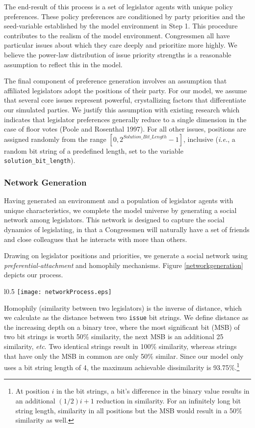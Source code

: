 \documentclass[pdftex,12pt]{llncs}
\begin{document}
The end-result of this process is a set of legislator agents with unique policy preferences. 
These policy preferences are conditioned by party priorities and the seed-variable established by the model environment in Step 1. 
This procedure contributes to the realism of the model environment. 
Congressmen all have particular issues about which they care deeply and prioritize more highly. 
We believe the power-law distribution of issue priority strengths is a reasonable assumption to reflect this in the model.

The final component of preference generation involves an assumption that affiliated legislators adopt the positions of their party.
For our model, we assume that several core issues represent powerful, crystallizing factors that differentiate our simulated parties.  
We justify this assumption with existing research which indicates that legislator preferences generally reduce to a single dimension in the case of floor votes (Poole and Rosenthal 1997). 
For all other issues, positions are assigned randomly from the range $[0, 2^{Solution\_Bit\_Length} - 1]$, inclusive (\textit{i.e.}, a random bit string of a predefined length, set to the variable \texttt{solution\_bit\_length}).

\subsubsection{Network Generation}
Having generated an environment and a population of legislator agents with unique characteristics, we complete the model universe by generating a social network among legislators. 
This network is designed to capture the social dynamics of legislating, in that a Congressmen will naturally have a set of friends and close colleagues that he interacts with more than others. 

Drawing on legislator positions and priorities, we generate a social network using \textit{preferential-attachment} and homophily mechanisms.
Figure \ref{networkgeneration} depicts our process. 

\begin{wrapfigure}{l}{0.5\textwidth}
  \texttt{[image: networkProcess.eps]}
 \caption[ ]{The network generation process}
 \label{networkgeneration}
\end{wrapfigure}

Homophily (similarity between two legislators) is the inverse of distance, which we calculate as the distance between two \texttt{issue} bit strings. 
We define distance as the increasing depth on a binary tree, where the most significant bit (MSB) of two bit strings is worth 50\% similarity, the next MSB is an additional 25 similarity, \textit{etc}.  
Two identical strings result in 100\% similarity, whereas strings that have only the MSB in common are only 50\% similar.    
Since our model only uses a bit string length of 4, the maximum achievable dissimilarity is 93.75\%.\footnote{At position $i$ in the bit strings, a bit's difference in the binary value results in an additional $(1/2)i + 1$ reduction in similarity. For an infinitely long bit string length, similarity in all positions but the MSB would result in a 50\% similarity as well.}
\end{document}
